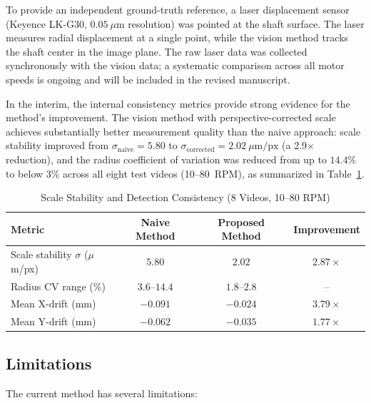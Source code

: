 \documentclass[journal]{IEEEtran}
\begin{document}
To provide an independent ground-truth reference, a laser displacement sensor
(Keyence LK-G30, $0.05~\mu\text{m}$ resolution) was pointed at the shaft surface.
The laser measures radial displacement at a single point, while the vision method
tracks the shaft center in the image plane. The raw laser data was collected
synchronously with the vision data; a systematic comparison across all motor
speeds is ongoing and will be included in the revised manuscript.

In the interim, the internal consistency metrics provide strong evidence for the
method's improvement. The vision method with perspective-corrected scale achieves
substantially better measurement quality than the naive approach: scale stability
improved from $\sigma_{\text{naive}} = 5.80$ to $\sigma_{\text{corrected}} =
2.02~\mu\text{m/px}$ (a 2.9$\times$ reduction), and the radius coefficient of
variation was reduced from up to $14.4\%$ to below $3\%$ across all eight
test videos (10--80~RPM), as summarized in Table~\ref{tab:stability}.

\begin{table}[!t]
\centering
\caption{Scale Stability and Detection Consistency (8 Videos, 10--80 RPM)}
\label{tab:stability}
\begin{tabular}{lccc}
\toprule
Metric & Naive Method & Proposed Method & Improvement \\
\midrule
Scale stability $\sigma$ ($\mu$m/px) & $5.80$ & $2.02$ & $2.87\times$ \\
Radius CV range (\%) & $3.6$--$14.4$ & $1.8$--$2.8$ & -- \\
Mean X-drift (mm) & $-0.091$ & $-0.024$ & $3.79\times$ \\
Mean Y-drift (mm) & $-0.062$ & $-0.035$ & $1.77\times$ \\
\bottomrule
\end{tabular}
\end{table}

\subsection{Limitations}

The current method has several limitations:
\end{document}
